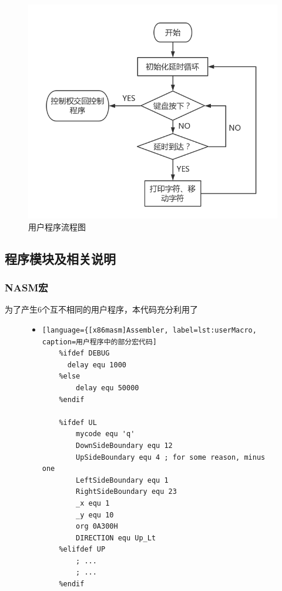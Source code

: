 \documentclass[a4paper]{article}
\begin{document}
    
    \begin{figure}
        \begin{center}
        \includegraphics[scale=0.4]{assets/program.png}
        \caption{用户程序流程图\label{fig:program}} 
        \end{center} 
    \end{figure} 
    
    
    \subsection{程序模块及相关说明}\label{subsec:modelIntroduction}
    \subsubsection{NASM宏}
    为了产生6个互不相同的用户程序，本代码充分利用了
    \begin{figure}
    \begin{itemize}
    \item[] \begin{lstlisting}[language={[x86masm]Assembler, label=lst:userMacro, caption=用户程序中的部分宏代码]
    %ifdef DEBUG
      delay equ 1000
    %else
        delay equ 50000
    %endif

    %ifdef UL
        mycode equ 'q'
        DownSideBoundary equ 12
        UpSideBoundary equ 4 ; for some reason, minus one
        LeftSideBoundary equ 1
        RightSideBoundary equ 23
        _x equ 1
        _y equ 10
        org 0A300H
        DIRECTION equ Up_Lt
    %elifdef UP
        ; ...
        ; ...
    %endif
    \end{lstlisting}
    \end{itemize}
    \end{figure}
    \lipsum[1]
\end{document}
